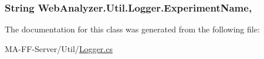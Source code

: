 \subsubsection[{Experiment\+Name}]{\setlength{\rightskip}{0pt plus 5cm}String Web\+Analyzer.\+Util.\+Logger.\+Experiment\+Name\hspace{0.3cm}{\ttfamily [get]}, {\ttfamily [set]}}\label{class_web_analyzer_1_1_util_1_1_logger_ae0228bcd61648d9b38e8aceaaf97024a}


The documentation for this class was generated from the following file\+:\begin{DoxyCompactItemize}
\item 
M\+A-\/\+F\+F-\/\+Server/\+Util/\hyperlink{_logger_8cs}{Logger.\+cs}\end{DoxyCompactItemize}
